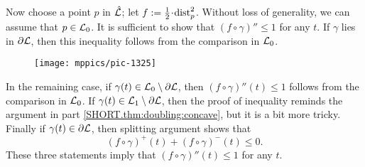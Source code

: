 Now choose a point $p$ in $\hat{\mathcal{L}}$;
let $f\df\tfrac12\cdot\distfun_p^2$.
Without loss of generality, we can assume that $p\in \mathcal{L}_0$.
It is sufficient to show that $(f\circ\gamma)''\le 1$ for any $t$.
If $\gamma$ lies in $\partial \mathcal{L}$, then this inequality follows from the comparison in $\mathcal{L}_0$.

\begin{wrapfigure}{r}{45mm}
\vskip-2mm
\centering
\texttt{[image: mppics/pic-1325]}
\end{wrapfigure}

In the remaining case, if $\gamma(t)\z\in \spc{L}_0\setminus\partial\spc{L}$, then $(f\circ\gamma)''(t)\le 1$ follows from the comparison in $\mathcal{L}_0$.
If $\gamma(t)\in \mathcal{L}_1\setminus\partial\mathcal{L}$, then the proof of inequality reminds the argument in part \ref{SHORT.thm:doubling:concave}, but it is a bit more tricky.
Finally if $\gamma(t)\in\partial\mathcal{L}$, then splitting argument shows that 
\[(f\circ\gamma)^+(t)+(f\circ\gamma)^-(t)\le 0.\]
These three statements imply that $(f\circ\gamma)''(t)\le 1$ for any $t$.
\qeds
